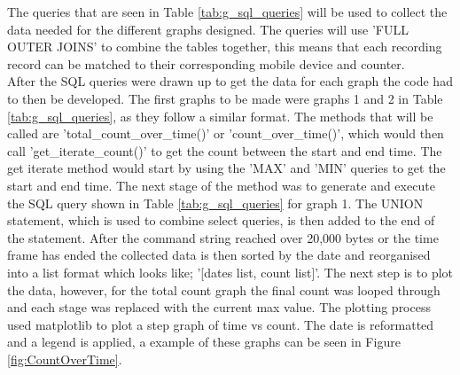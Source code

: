 \documentclass{report}
\begin{document}
The queries that are seen in Table \ref{tab:g_sql_queries} will be used to collect the data needed for the different graphs designed. The queries will use 'FULL OUTER JOINS'\cite{Joins} to combine the tables together, this means that each recording record can be matched to their corresponding mobile device and counter. \\ \newline
After the SQL queries were drawn up to get the data for each graph the code had to then be developed. The first graphs to be made were graphs 1 and 2 in Table \ref{tab:g_sql_queries}, as they follow a similar format. The methods that will be called are 'total\_count\_over\_time()' or 'count\_over\_time()', which would then call 'get\_iterate\_count()' to get the count between the start and end time. The get iterate method would start by using the 'MAX' and 'MIN' queries to get the start and end time. The next stage of the method was to generate and execute the SQL query shown in Table \ref{tab:g_sql_queries} for graph 1. The UNION statement, which is used to combine select queries, is then added to the end of the statement. After the command string reached over 20,000 bytes or the time frame has ended the collected data is then sorted by the date and reorganised into a list format which looks like; '[dates list, count list]'. The next step is to plot the data, however, for the total count graph the final count was looped through and each stage was replaced with the current max value. The plotting process used matplotlib to plot a step graph of time vs count. The date is reformatted and a legend is applied, a example of these graphs can be seen in Figure \ref{fig:CountOverTime}. \\ \newline
\end{document}
